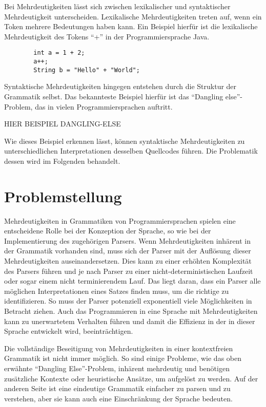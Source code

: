 \documentclass[runningheads]{llncs}
\begin{document}
	Bei Mehrdeutigkeiten lässt sich zwischen lexikalischer und syntaktischer Mehrdeutigkeit unterscheiden.
	Lexikalische Mehrdeutigkeiten treten auf, wenn ein Token mehrere Bedeutungen haben kann.
	Ein Beispiel hierfür ist die lexikalische Mehrdeutigkeit des Tokens ``+'' in der Programmiersprache Java.

	\begin{verbatim}
		int a = 1 + 2;
		a++;
		String b = "Hello" + "World";
	\end{verbatim}

	Syntaktische Mehrdeutigkeiten hingegen entstehen durch die Struktur der Grammatik selbst.
	Das bekannteste Beispiel hierfür ist das ``Dangling else''-Problem, das in vielen Programmiersprachen auftritt.

	HIER BEISPIEL DANGLING-ELSE


	Wie dieses Beispiel erkennen lässt,
	können syntaktische Mehrdeutigkeiten zu unterschiedlichen Interpretationen desselben Quellcodes führen.
	Die Problematik dessen wird im Folgenden behandelt.


	\section{Problemstellung}

	Mehrdeutigkeiten in Grammatiken von Programmiersprachen
	spielen eine entscheidene Rolle bei der Konzeption der Sprache,
	so wie bei der Implementierung des zugehörigen Parsers.
	Wenn Mehrdeutigkeiten inhärent in der Grammatik vorhanden sind,
	muss sich der Parser mit der Auflösung dieser Mehrdeutigkeiten auseinandersetzen.
	Dies kann zu einer erhöhten Komplexität des Parsers führen
	und je nach Parser zu einer nicht-deterministischen Laufzeit oder sogar einem nicht terminierendem Lauf.
	Das liegt daran, dass ein Parser alle möglichen Interpretationen eines Satzes finden muss, um die richtige zu identifizieren.
	So muss der Parser potenziell exponentiell viele Möglichkeiten in Betracht ziehen.
	Auch das Programmieren in eine Sprache mit Mehrdeutigkeiten kann zu unerwartetem Verhalten führen
	und damit die Effizienz in der in dieser Sprache entwickelt wird, beeinträchtigen.

	Die vollständige Beseitigung von Mehrdeutigkeiten in einer kontextfreien Grammatik ist nicht immer möglich.
	So sind einige Probleme, wie das oben erwähnte ``Dangling Else''-Problem,
	inhärent mehrdeutig und benötigen zusätzliche Kontexte oder heuristische Ansätze, um aufgelöst zu werden.
	Auf der anderen Seite ist eine eindeutige Grammatik einfacher zu parsen und zu verstehen,
	aber sie kann auch eine Einschränkung der Sprache bedeuten.
\end{document}
